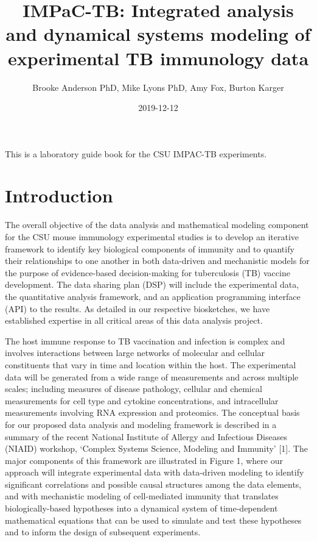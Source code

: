 \documentclass[]{book}
\title{IMPaC-TB: Integrated analysis and dynamical systems modeling of
experimental TB immunology data}
\author{Brooke Anderson PhD, Mike Lyons PhD, Amy Fox, Burton Karger}
\date{2019-12-12}
\begin{document}
\maketitle

{
\setcounter{tocdepth}{1}
\tableofcontents
}
This is a laboratory guide book for the CSU IMPAC-TB experiments.

\chapter{Introduction}\label{intro}

The overall objective of the data analysis and mathematical modeling
component for the CSU mouse immunology experimental studies is to
develop an iterative framework to identify key biological components of
immunity and to quantify their relationships to one another in both
data-driven and mechanistic models for the purpose of evidence-based
decision-making for tuberculosis (TB) vaccine development. The data
sharing plan (DSP) will include the experimental data, the quantitative
analysis framework, and an application programming interface (API) to
the results. As detailed in our respective biosketches, we have
established expertise in all critical areas of this data analysis
project.

The host immune response to TB vaccination and infection is complex and
involves interactions between large networks of molecular and cellular
constituents that vary in time and location within the host. The
experimental data will be generated from a wide range of measurements
and across multiple scales; including measures of disease pathology,
cellular and chemical measurements for cell type and cytokine
concentrations, and intracellular measurements involving RNA expression
and proteomics. The conceptual basis for our proposed data analysis and
modeling framework is described in a summary of the recent National
Institute of Allergy and Infectious Diseases (NIAID) workshop, `Complex
Systems Science, Modeling and Immunity' {[}1{]}. The major components of
this framework are illustrated in Figure 1, where our approach will
integrate experimental data with data-driven modeling to identify
significant correlations and possible causal structures among the data
elements, and with mechanistic modeling of cell-mediated immunity that
translates biologically-based hypotheses into a dynamical system of
time-dependent mathematical equations that can be used to simulate and
test these hypotheses and to inform the design of subsequent
experiments.
\end{document}
